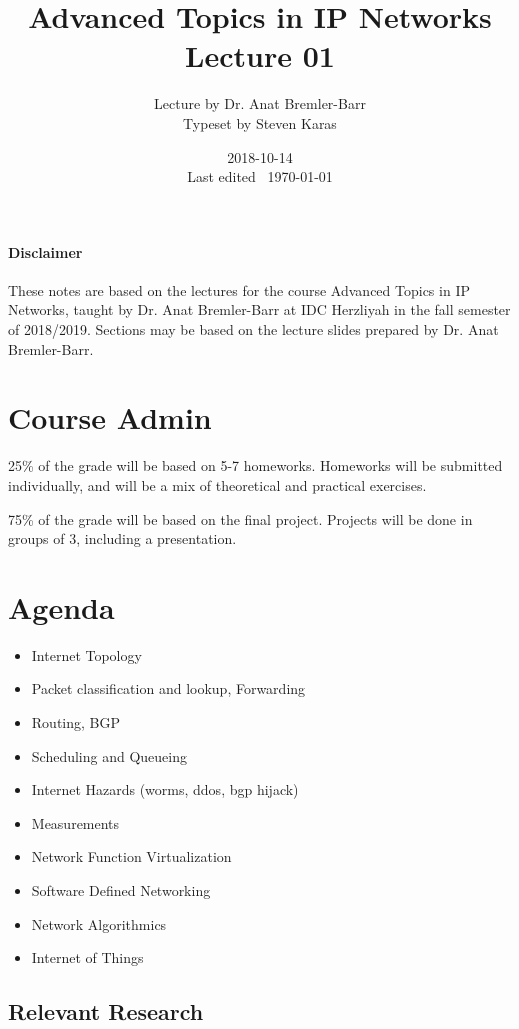 \documentclass{idc_msc}
\title{Advanced Topics in IP Networks \\\large Lecture 01}
\date{2018-10-14 \\ Last edited \currenttime\ \today}
\author{Lecture by Dr. Anat Bremler-Barr\\Typeset by Steven Karas}
\begin{document}
\maketitle

\paragraph{Disclaimer}

These notes are based on the lectures for the course Advanced Topics in IP Networks, taught by Dr. Anat Bremler-Barr at IDC Herzliyah in the fall semester of 2018/2019.
Sections may be based on the lecture slides prepared by Dr. Anat Bremler-Barr.

\nocite{Varghese:2004:NAI:1203994}
\nocite{Crovella:2006:IMI:1196480}
\nocite{Kurose:2002:CNT:549735}

\section{Course Admin}

25\% of the grade will be based on 5-7 homeworks.
Homeworks will be submitted individually, and will be a mix of theoretical and practical exercises.

75\% of the grade will be based on the final project.
Projects will be done in groups of 3, including a presentation.

\section{Agenda}

\begin{itemize}
  \item Internet Topology
  \item Packet classification and lookup, Forwarding
  \item Routing, BGP
  \item Scheduling and Queueing
  \item Internet Hazards (worms, ddos, bgp hijack)
  \item Measurements
  \item Network Function Virtualization
  \item Software Defined Networking
  \item Network Algorithmics
  \item Internet of Things
\end{itemize}

\subsection{Relevant Research}
\end{document}
